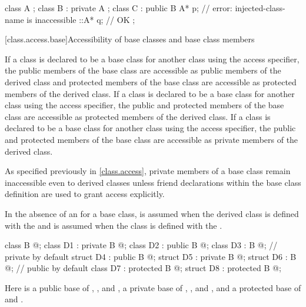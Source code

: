 \begin{example}
\begin{codeblock}
class A { };
class B : private A { };
class C : public B {
  A* p;             // error: injected-class-name  is inaccessible
  ::A* q;           // OK
};
\end{codeblock}
\end{example}

[class.access.base]{Accessibility of base classes and base class members}%
%
%
%
%

\pnum
If a class is declared to be a base class for another class using the
access specifier, the
public members of the base class are accessible as
public members of the derived class and
protected members of the base class are accessible as
protected members of the derived class.
If a class is declared to be a base class for another class using the
access specifier, the
public and protected members of the base class are accessible as
protected members of the derived class.
If a class is declared to be a base class for another class using the
access specifier, the
public and protected
members of the base class are accessible as private
members of the derived class.
\begin{footnote}
As specified previously in \ref{class.access},
private members of a base class remain inaccessible even to derived classes
unless friend
declarations within the base class definition are used to grant access explicitly.
\end{footnote}

\pnum
In the absence of an
for a base class,
is assumed when the derived class is
defined with the 
and
is assumed when the class is
defined with the 
.
\begin{example}
\begin{codeblock}
class B { @\commentellip@ };
class D1 : private B { @\commentellip@ };
class D2 : public B { @\commentellip@ };
class D3 : B { @\commentellip@ };             //  private by default
struct D4 : public B { @\commentellip@ };
struct D5 : private B { @\commentellip@ };
struct D6 : B { @\commentellip@ };            //  public by default
class D7 : protected B { @\commentellip@ };
struct D8 : protected B { @\commentellip@ };
\end{codeblock}

Here
is a public base of
,
,
and
,
a private base of
,
,
and
,
and a protected base of
and
.
\end{example}

